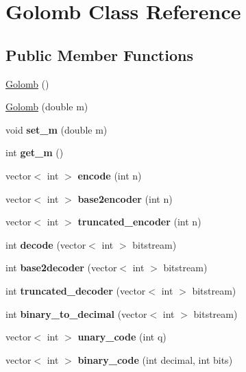 \hypertarget{classGolomb}{}\section{Golomb Class Reference}
\label{classGolomb}
\subsection*{Public Member Functions}
\begin{DoxyCompactItemize}
\item 
\hyperlink{classGolomb_aa6103d56ebec9decc11a69bf6be83208}{Golomb} ()
\item 
\hyperlink{classGolomb_aca358c8c3c8706b470c74f64f9509a64}{Golomb} (double m)
\item 
\mbox{\label{classGolomb_a8d8c2f271ad2e3716ddbba7fcde15619}} 
void {\bfseries set\+\_\+m} (double m)
\item 
\mbox{\label{classGolomb_aa45900c84d473bbfc3d0de0b8879d10e}} 
int {\bfseries get\+\_\+m} ()
\item 
\mbox{\label{classGolomb_a39581a9a0a9a68cce93fdb09005a3b3c}} 
vector$<$ int $>$ {\bfseries encode} (int n)
\item 
\mbox{\label{classGolomb_a91927ef00d074201fba0a176c7e11925}} 
vector$<$ int $>$ {\bfseries base2encoder} (int n)
\item 
\mbox{\label{classGolomb_a2a12ea7e114395b3c20268a68ede3e29}} 
vector$<$ int $>$ {\bfseries truncated\+\_\+encoder} (int n)
\item 
\mbox{\label{classGolomb_a6591f253a23651ae961e6cc9e9d26177}} 
int {\bfseries decode} (vector$<$ int $>$ bitstream)
\item 
\mbox{\label{classGolomb_a789cca4aa2ebfb18e2acd50565099ac9}} 
int {\bfseries base2decoder} (vector$<$ int $>$ bitstream)
\item 
\mbox{\label{classGolomb_a395b68ea88abe771d02ba62aff2c559a}} 
int {\bfseries truncated\+\_\+decoder} (vector$<$ int $>$ bitstream)
\item 
\mbox{\label{classGolomb_a13a756ac1e640acdccab04cead87d77b}} 
int {\bfseries binary\+\_\+to\+\_\+decimal} (vector$<$ int $>$ bitstream)
\item 
\mbox{\label{classGolomb_aa5f4148a661789fb5035a4ed7e1aa133}} 
vector$<$ int $>$ {\bfseries unary\+\_\+code} (int q)
\item 
\mbox{\label{classGolomb_a4ce5ce960d0e30505eb5b39e5dc84a6a}} 
vector$<$ int $>$ {\bfseries binary\+\_\+code} (int decimal, int bits)
\end{DoxyCompactItemize}


